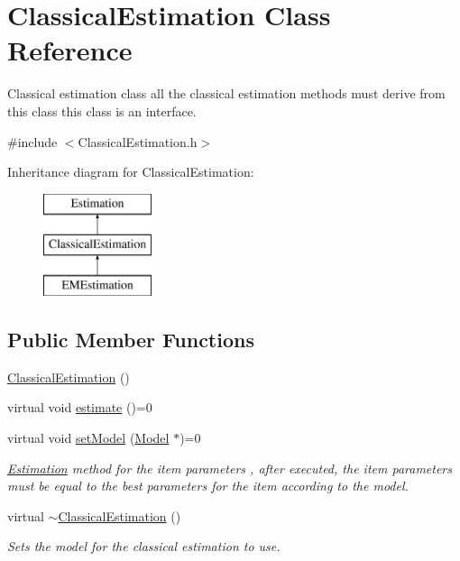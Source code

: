 \hypertarget{classClassicalEstimation}{}\section{Classical\+Estimation Class Reference}
\label{classClassicalEstimation}


Classical estimation class all the classical estimation methods must derive from this class this class is an interface.  




{\ttfamily \#include $<$Classical\+Estimation.\+h$>$}

Inheritance diagram for Classical\+Estimation\+:\begin{figure}[H]
\begin{center}
\leavevmode
\includegraphics[height=3.000000cm]{classClassicalEstimation}
\end{center}
\end{figure}
\subsection*{Public Member Functions}
\begin{DoxyCompactItemize}
\item 
\hyperlink{classClassicalEstimation_a144021420398e280993eab60a219e1d9}{Classical\+Estimation} ()
\item 
virtual void \hyperlink{classClassicalEstimation_a182aef8049a48cf1bd09bff642df8c01}{estimate} ()=0
\item 
virtual void \hyperlink{classClassicalEstimation_a4add5ad245795b82380af0c34840c603}{set\+Model} (\hyperlink{classModel}{Model} $\ast$)=0
\begin{DoxyCompactList}\small\item\em \hyperlink{classEstimation}{Estimation} method for the item parameters , after executed, the item parameters must be equal to the best parameters for the item according to the model. \end{DoxyCompactList}\item 
virtual \hyperlink{classClassicalEstimation_a6d439cbcdb248008c52a0d59746e3502}{$\sim$\+Classical\+Estimation} ()
\begin{DoxyCompactList}\small\item\em Sets the model for the classical estimation to use. \end{DoxyCompactList}\end{DoxyCompactItemize}
